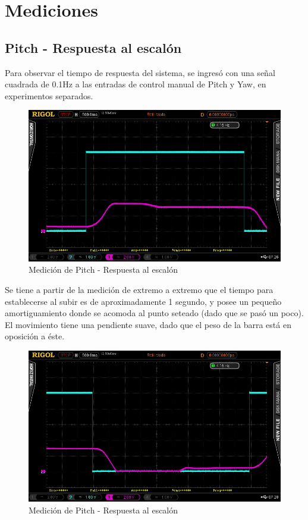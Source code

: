 \documentclass{article}
\begin{document}
\newpage

\section{Mediciones}

\subsection{Pitch - Respuesta al escalón}

Para observar el tiempo de respuesta del sistema, se ingresó con una señal cuadrada de 0.1Hz a las entradas de control manual de Pitch y Yaw, en experimentos separados.\\

\begin{figure}[H]
\centering
\includegraphics[width=0.8\linewidth]{images/escalonPitch.jpeg}\caption{Medición de Pitch - Respuesta al escalón}
\end{figure}

Se tiene a partir de la medición de extremo a extremo que el tiempo para establecerse al subir es de aproximadamente 1 segundo, y posee un pequeño amortiguamiento donde se acomoda al punto seteado (dado que se pasó un poco). El movimiento tiene una pendiente suave, dado que el peso de la barra está en oposición a éste.

\begin{figure}[H]
\centering
\includegraphics[width=0.8\linewidth]{images/escalonInversoPitch.jpeg}\caption{Medición de Pitch - Respuesta al escalón}
\end{figure}
\end{document}
